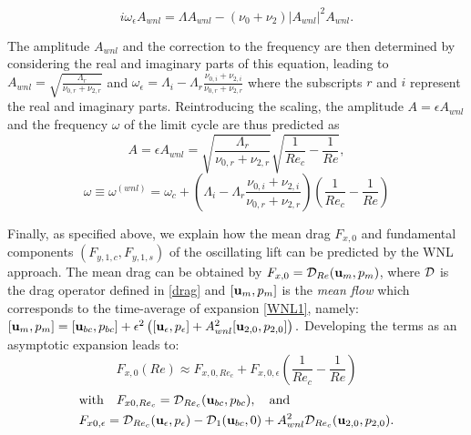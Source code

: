\documentclass[twocolumn,10pt]{asme2ej}
\newcommand{\be}[1]{ \begin{equation} \label{#1}}
\newcommand{\ee}{\end{equation}}
\begin{document}
\be{WNL3}
i \omega_\epsilon A_{wnl} = \Lambda A_{wnl} - (\nu_0+\nu_2)  |A_{wnl}|^2 A_{wnl}.
\ee


The amplitude $A_{wnl}$ and the correction to the frequency are then determined by considering the real and imaginary parts of this equation, leading to
$
A_{wnl}= \sqrt{ \frac{\Lambda_r}{\nu_{0,r}+\nu_{2,r}}}
$ and
$
\omega_\epsilon = \Lambda_i- \Lambda_r \frac{\nu_{0,i}+\nu_{2,i}}{\nu_{0,r}+\nu_{2,r}} 
$
where the subscripts $r$ and $i$ represent the real and imaginary parts.
Reintroducing the scaling, the  amplitude $A =  \epsilon A_{wnl} $ and the frequency $\omega$ of the limit cycle are thus predicted as
\be{ANL} 
A =  \epsilon A_{wnl} =\sqrt{ \frac{\Lambda_r}{\nu_{0,r}+\nu_{2,r} }} \sqrt{\frac{1}{Re_c}-\frac{1}{Re}},
\ee
\be{omegaWNL} 
\omega \equiv \omega^{(wnl)} =\omega_c+ \left( \Lambda_i- \Lambda_r \frac{\nu_{0,i}+\nu_{2,i}}{\nu_{0,r}+\nu_{2,r}} \right) \left(\frac{1}{Re_c}-\frac{1}{Re}\right)
\ee 


Finally, as specified above, we explain how the mean drag $F_{x,0}$ and fundamental components $(F_{y,1,c},F_{y,1,s})$ of the oscillating lift can be predicted by the WNL approach.
The mean drag  can be obtained by $F_{x,0} = {\cal D}_{Re}({\bf u}_m,p_m)$, where ${\cal D}$ is the drag operator defined in \eqref{drag} and 
$[{\bf u}_m,p_m]$ is the {\em mean flow}  
which corresponds to the time-average of expansion  \eqref{WNL1}, namely:
$
[{\bf u}_m,p_m] = [{\bf u}_{bc},p_{bc}] +\epsilon^2 \left( [{\bf u}_\epsilon,p_\epsilon] + A_{wnl}^2 [{\bf u}_{2,0}, p_{2,0} ] \right).
$
Developing the terms as an asymptotic expansion leads to:
\be{drag_cos}
 F_{x,0}(Re) \approx F_{x,0,{Re_c}} +  F_{x,0,\epsilon} \left(\frac{1}{Re_c}-\frac{1}{Re}\right)
\ee 
\begin{equation*}
\begin{aligned}
& \mbox{with} \quad F_{x0,{Re_c}}  = {\cal D}_{Re_c} ({\bf u}_{bc},p_{bc}), \quad \mbox{and}  
\\ 
& F_{x0,\epsilon} = {\cal D}_{Re_c} ({\bf u}_\epsilon, p_\epsilon ) - {\cal D}_{1} ({\bf u}_{bc},0) 
+ A_{wnl}^2 {\cal D}_{Re_c} ({\bf u}_{2,0},p_{2,0}). 
\end{aligned}
\end{equation*}
\end{document}
